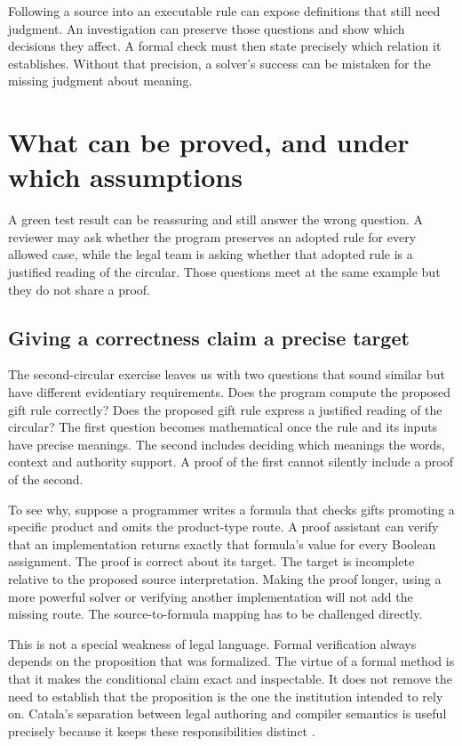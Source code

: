 \documentclass[12pt,a4paper,oneside,openany]{book}
\begin{document}
Following a source into an executable rule can expose definitions that still
need judgment. An investigation can preserve those questions and show which
decisions they affect. A formal check must then state precisely which relation
it establishes. Without that precision, a solver's success can be mistaken for
the missing judgment about meaning.

\chapter{What can be proved, and under which assumptions}
\label{ch:proof}

A green test result can be reassuring and still answer the wrong question. A
reviewer may ask whether the program preserves an adopted rule for every allowed
case, while the legal team is asking whether that adopted rule is a justified
reading of the circular. Those questions meet at the same example but they do
not share a proof.

\section{Giving a correctness claim a precise target}
\label{merge:M03:00}

\label{sec:proof-target}
The second-circular exercise leaves us with two questions that sound similar but
have different evidentiary requirements. Does the program compute the proposed
gift rule correctly? Does the proposed gift rule express a justified reading of
the circular? The first question becomes mathematical once the rule and its
inputs have precise meanings. The second includes deciding which meanings the
words, context and authority support. A proof of the first cannot silently
include a proof of the second.

To see why, suppose a programmer writes a formula that checks gifts promoting a
specific product and omits the product-type route. A proof assistant can verify
that an implementation returns exactly that formula's value for every Boolean
assignment. The proof is correct about its target. The target is incomplete
relative to the proposed source interpretation. Making the proof longer, using a
more powerful solver or verifying another implementation will not add the
missing route. The source-to-formula mapping has to be challenged directly.

This is not a special weakness of legal language. Formal verification always
depends on the proposition that was formalized. The virtue of a formal method
is that it makes the conditional claim exact and inspectable. It does not remove
the need to establish that the proposition is the one the institution intended
to rely on. Catala's separation between legal authoring and compiler semantics
is useful precisely because it keeps these responsibilities distinct
\citep[core language and compilation sections]{catala2021}.
\end{document}
